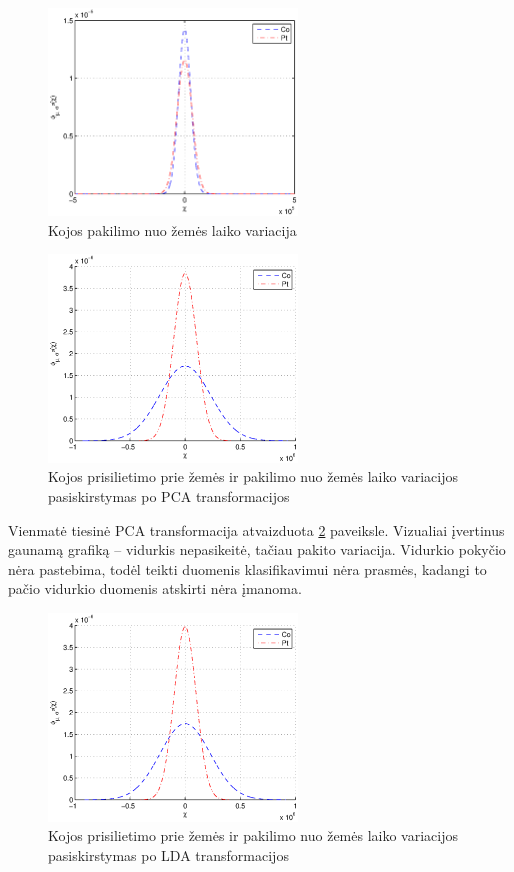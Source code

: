 \documentclass[]{vgtuef}
\begin{document}
\begin{figure}[!t]
  \centering
  \includegraphics[width=250px]{figures/swing_phase.eps}
  \caption{Kojos pakilimo nuo žemės laiko variacija}
  \label{fig:swing_var}
\end{figure}

\begin{figure}[!t]
  \centering
  \includegraphics[width=250px]{figures/st_sw_linear_kpca.eps}
  \caption{Kojos prisilietimo prie žemės ir pakilimo nuo žemės laiko variacijos pasiskirstymas po PCA transformacijos}
  \label{fig:linear_pca}
\end{figure}

Vienmatė tiesinė PCA transformacija atvaizduota \ref{fig:linear_pca} paveiksle. Vizualiai įvertinus gaunamą grafiką -- vidurkis nepasikeitė, tačiau pakito variacija. Vidurkio pokyčio nėra pastebima, todėl teikti duomenis klasifikavimui nėra prasmės, kadangi to pačio vidurkio duomenis atskirti nėra įmanoma.

\begin{figure}[!t]
  \centering
  \includegraphics[width=250px]{figures/st_sw_linear_lda.eps}
  \caption{Kojos prisilietimo prie žemės ir pakilimo nuo žemės laiko variacijos pasiskirstymas po LDA transformacijos}
  \label{fig:linear_lda}
\end{figure}
\end{document}
